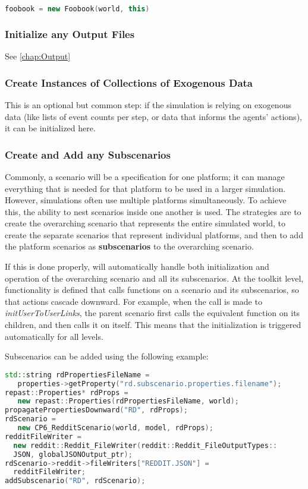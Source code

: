 \begin{lstlisting}[frame=single, language=C++]
foobook = new Foobook(world, this)
\end{lstlisting}
	
\subsubsection{ Initialize any Output Files}
See \ref{chap:Output}

\subsubsection{Create Instances of Collections of Exogenous Data}
This is an optional but common step: if the simulation is relying on exogenous data (like lists of event counts per step, or data that informs the agents' actions), it can be initialized here.

\subsubsection{Create and Add any Subscenarios}
\par Commonly, a scenario will be a specification for one platform; it can manage everything that is needed for that platform to be used in a larger simulation. However, simulations often use multiple platforms simultaneously. To achieve this, the ability to nest scenarios inside one another is used. The strategies are to create the overarching scenario that represents the entire simulated world, to create the separate scenarios that represent individual platforms, and then to add the platform scenarios as \textbf{subscenarios} to the overarching scenario.

\par If this is done properly, \rhpc will automatically handle both initialization and operation of the overarching scenario and all its subscenarios. At the toolkit level, functionality is defined that calls functions on a scenario and its subscenarios, so that actions cascade downward. For example, when the call is made to \textit{initUserToUserLinks}, the parent scenario first calls the equivalent function on its children, and then calls it on itself. This means that the initialization is triggered automatically for all levels.

Subscenarios can be added using the following example:

\begin{lstlisting}[frame=single, language=C++]
std::string rdPropertiesFileName = 
   properties->getProperty("rd.subscenario.properties.filename");
repast::Properties* rdProps = 
   new repast::Properties(rdPropertiesFileName, world);
propagatePropertiesDownward("RD", rdProps);
rdScenario = 
   new CP6_RedditScenario(world, model, rdProps);
redditFileWriter = 
  new reddit::Reddit_FileWriter(reddit::Reddit_FileOutputTypes::
  JSON, globalJSONOutput_ptr);
rdScenario->reddit->fileWriters["REDDIT.JSON"] = 
  redditFileWriter;
addSubscenario("RD", rdScenario);
\end{lstlisting}

